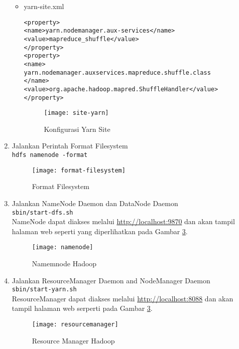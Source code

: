 \documentclass[a4paper]{tufte-handout}
\begin{document}
\begin{enumerate}
\begin{itemize}
\item yarn-site.xml
\begin{lstlisting}
<property>
<name>yarn.nodemanager.aux-services</name>
<value>mapreduce_shuffle</value>
</property>
<property>
<name>
yarn.nodemanager.auxservices.mapreduce.shuffle.class
</name>
<value>org.apache.hadoop.mapred.ShuffleHandler</value>
</property>
\end{lstlisting}
\begin{figure}[!ht]
\texttt{[image: site-yarn]}
\caption{Konfigurasi Yarn Site}
\label{gam:site-yarn}
\end{figure}
\end{itemize}

\item Jalankan Perintah Format Filesystem \\
{\tt hdfs namenode -format}
\begin{figure}[!ht]
\texttt{[image: format-filesystem]}
\caption{Format Filesystem}
\label{gam:format-filesystem}
\end{figure}

\item Jalankan NameNode Daemon dan DataNode Daemon \\
{\tt sbin/start-dfs.sh} \\
NameNode dapat diakses melalui \url{http://localhost:9870} dan akan tampil halaman web seperti yang diperlihatkan pada Gambar \ref{gam:namenode}.
\begin{figure}[!ht]
\texttt{[image: namenode]}
\caption{Namemnode Hadoop}
\label{gam:namenode}
\end{figure}

\item Jalankan ResourceManager Daemon and NodeManager Daemon \\
{\tt sbin/start-yarn.sh} \\
ResourceManager dapat diakses melalui \url{http://localhost:8088} dan akan tampil halaman web serperti pada Gambar \ref{gam:namenode}.
\begin{figure}[!ht]
\texttt{[image: resourcemanager]}
\caption{Resource Manager Hadoop}
\label{gam:resourcemanager}
\end{figure}
\end{enumerate}
\end{document}
